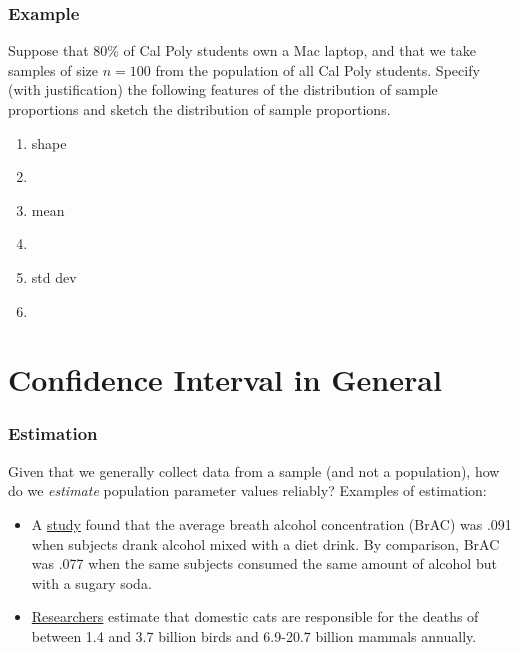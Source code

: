 \begin{frame}
\frametitle{Example}
Suppose that 80\% of Cal Poly students own a Mac laptop, and that we take samples of size $n=100$ from the population of all Cal Poly students.
Specify (with justification) the following features of the distribution of sample proportions and sketch the distribution of sample proportions.
\vskip10pt
\begin{enumerate}
\item shape
\item[]
\item mean
\item[]
\item std dev
\item[]
\end{enumerate}
\vskip50pt
\end{frame}

\section[CI general]{Confidence Interval in General}
\begin{frame}
\end{frame}

\begin{frame}
\frametitle{Estimation}
Given that we generally collect data from a sample (and not a population), how do we \emph{estimate} population parameter values reliably?  Examples of estimation:
    \begin{itemize}
        \item
        A \href{http://www.npr.org/blogs/thesalt/2013/01/31/170748045/why-mixing-alcohol-with-diet-soda-may-make-you-drunker?sc=tw}{study} found that the average breath alcohol concentration (BrAC) was .091 when subjects drank alcohol mixed with a diet drink. By comparison, BrAC was .077 when the same subjects consumed the same amount of alcohol but with a sugary soda.
        \item
        \href{http://www.bbc.co.uk/news/science-environment-21236690}{Researchers} estimate that domestic cats are responsible for the deaths of between 1.4 and 3.7 billion birds and 6.9-20.7 billion mammals annually.
    \end{itemize}
\end{frame}



